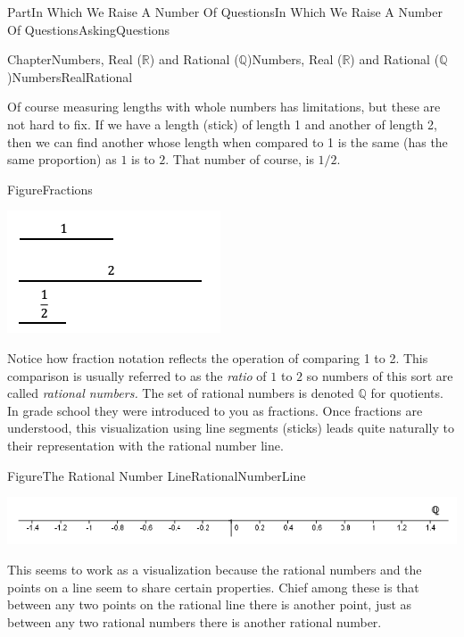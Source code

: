 \documentclass[oneside,10pt,]{book}
\numberwithin{equation}{part}
\newcommand{\RR}{\mathbb {R}}
\newcommand{\QQ}{\mathbb {Q}}
\begin{document}
\begin{partptx}{Part}{In Which We Raise A Number Of Questions}{}{In Which We Raise A Number Of Questions}{}{}{AskingQuestions}
\begin{chapterptx}{Chapter}{Numbers, Real (\(\RR\)) and Rational (\(\QQ\))}{}{Numbers, Real (\(\RR\)) and Rational (\(\QQ\))}{}{}{NumbersRealRational}
\begin{introduction}{}
Of course measuring lengths with whole numbers has limitations, but these are not hard to fix. If we have a length (stick) of length 1 and another of length 2, then we can find another whose length when compared to 1 is the same (has the same proportion) as \(1\) is to \(2\). That number of course, is \(1/2\).%
\begin{figureptx}{Figure}{}{Fractions}{}%
\begin{image}{0.125}{0.75}{0.125}{}%
\includegraphics[width=\linewidth]{external/images/Fractions.png}
\end{image}%
\tcblower
\end{figureptx}%
Notice how fraction notation reflects the operation of comparing 1 to 2.  This comparison is usually referred to as the \emph{ratio} of \(1\) to \(2\) so numbers of this sort are called \emph{rational numbers.} The set of rational numbers is denoted \(\QQ\) for quotients.  In grade school they were introduced to you as fractions.  Once fractions are understood, this visualization using line segments (sticks) leads quite naturally to their representation with the rational number line.%
\begin{figureptx}{Figure}{The Rational Number Line}{RationalNumberLine}{}%
\begin{image}{0}{1}{0}{}%
\includegraphics[width=\linewidth]{external/images/RationalNumberLine.png}
\end{image}%
\tcblower
\end{figureptx}%
This seems to work as a visualization because the rational numbers and the points on a line seem to share certain properties.  Chief among these is that between any two points on the rational line there is another point, just as between any two rational numbers there is another rational number.%

\end{introduction}
\end{chapterptx}
\end{partptx}
\end{document}
